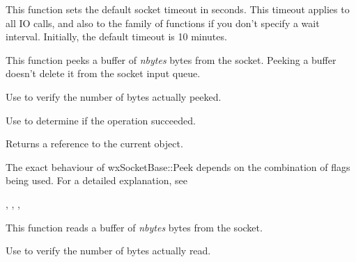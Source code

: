 %
%
\label{wxsocketbasesettimeout}


This function sets the default socket timeout in seconds. This timeout
applies to all IO calls, and also to the  family
of functions if you don't specify a wait interval. Initially, the default
timeout is 10 minutes.

%
%
\label{wxsocketbasepeek}


This function peeks a buffer of {\it nbytes} bytes from the socket.
Peeking a buffer doesn't delete it from the socket input queue.

Use  to verify the number of bytes actually peeked.

Use  to determine if the operation succeeded.





Returns a reference to the current object.


The exact behaviour of wxSocketBase::Peek depends on the combination
of flags being used. For a detailed explanation, see 


, 
, 
, 

%
%
\label{wxsocketbaseread}


This function reads a buffer of {\it nbytes} bytes from the socket.

Use  to verify the number of bytes actually read.

